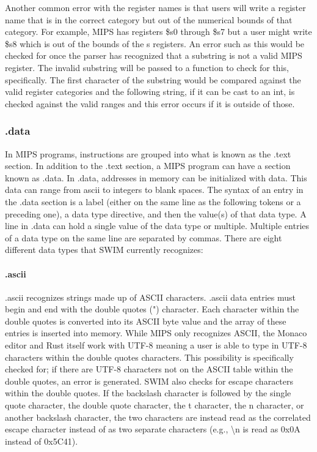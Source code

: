\documentclass[
    paper=letter,
    parskip=half,
    fontsize=12pt,
    titlepage=firstiscover,
    toc=bibliography,
    numbers=endperiod
]{scrartcl}
\begin{document}
Another common error with the register names is that users will write a
register name that is in the correct category but out of the numerical
bounds of that category. For example, MIPS has registers \$s0 through
\$s7 but a user might write \$s8 which is out of the bounds of the s
registers. An error such as this would be checked for once the parser
has recognized that a substring is not a valid MIPS register. The
invalid substring will be passed to a function to check for this,
specifically. The first character of the substring would be compared
against the valid register categories and the following string, if it
can be cast to an int, is checked against the valid ranges and this
error occurs if it is outside of those.

\subsubsection{.data}

In MIPS programs, instructions are grouped into what is known as the
.text section. In addition to the .text section, a MIPS program can have
a section known as .data. In .data, addresses in memory can be
initialized with data. This data can range from ascii to integers to
blank spaces. The syntax of an entry in the .data section is a label
(either on the same line as the following tokens or a preceding one), a
data type directive, and then the value(s) of that data type. A line in
.data can hold a single value of the data type or multiple. Multiple
entries of a data type on the same line are separated by commas. There
are eight different data types that SWIM currently recognizes:

\paragraph{.ascii}
.ascii recognizes strings made up of ASCII characters.
.ascii data entries must begin and end with the double quotes (") character.
Each character within the double quotes is converted into its ASCII byte value and
the array of these entries is inserted into memory.
While MIPS only recognizes ASCII, the Monaco editor and Rust itself work with UTF-8 meaning a user is able to type in
UTF-8 characters within the double quotes characters.
This possibility is specifically checked for;
if there are UTF-8 characters not on the ASCII table within the double quotes, an error is generated.
SWIM also checks for escape characters within the double quotes.
If the backslash character is followed by the single quote character, the double quote character, the t character, the n character, or another backslash character,
the two characters are instead read as the correlated escape character instead of as two separate characters (e.g., \textbackslash{n} is read as 0x0A instead of 0x5C41).
\end{document}
